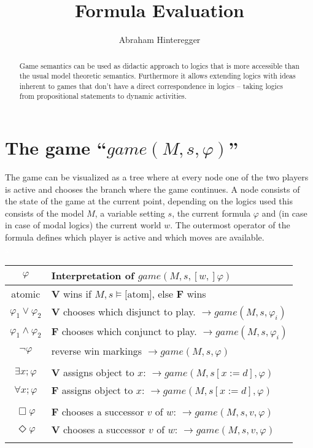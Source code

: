 \documentclass{tufte-handout}
\title{Formula Evaluation}
\author{Abraham Hinteregger}
\newcommand{\V}{\ensuremath{\mathbf{V}}\xspace}
\newcommand{\F}{\ensuremath{\mathbf{F}}\xspace}
\begin{document}
\maketitle%

\begin{abstract}
\noindent Game semantics can be used as didactic approach to logics that is more accessible than the usual model theoretic semantics. Furthermore it allows extending logics with ideas inherent to games that don't have a direct correspondence in logics -- taking logics from propositional statements to dynamic activities.
\end{abstract}


\section{The game ``$game(M,s,\varphi)$''}
The game can be visualized as a tree where at every node one of the two players is active and chooses the branch where the game continues. A node consists of the state of the game at the current point, depending on the logics used this consists of the model $M$, a variable setting $s$, the current formula $\varphi$ and (in case in case of modal logics) the current world $w$.
The outermost operator of the formula defines which player is active and which moves are available.
\\
\textcolor{white}{x}\\

\begin{tabular}{cl}
$\varphi$ & Interpretation of $game(M,s,[w,]\varphi)$\\\hline
atomic &  \V wins if $M,s\models \text{[atom]}$, else \F wins\\
$\varphi_1 \lor \varphi_2$ & \V chooses which disjunct to play. $\rightarrow game(M,s,\varphi_i)$\\
   $\varphi_1 \land \varphi_2$ & \F chooses which conjunct to play. $\rightarrow game(M,s,\varphi_i)$\\
  $ \lnot \varphi$ & reverse win markings $\rightarrow game(M,s,\varphi)$\\\\
  $\exists x ; \varphi$ & \V  assigns object to $x$: $\rightarrow game(M,s[x:=d],\varphi)$\\
  $\forall x ; \varphi$& \F assigns object to $x$:  $\rightarrow game(M,s[x:=d],\varphi)$\\\\
 $\Box \varphi$ & \F chooses a successor $v$ of $w$: $\rightarrow game(M,s,v,\varphi)$\\
 $\Diamond \varphi$ & \V chooses a successor $v$ of $w$: $\rightarrow game(M,s,v,\varphi)$\\\\
\end{tabular}
\end{document}
